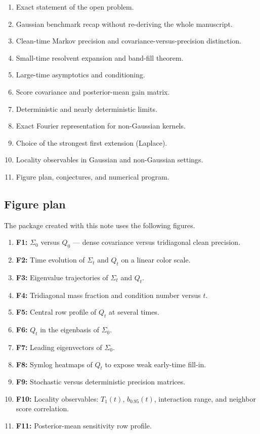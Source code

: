\documentclass[11pt]{article}
\begin{document}
\begin{enumerate}[label=\textbf{L\arabic*.},leftmargin=1.2cm]
\item Exact statement of the open problem.
\item Gaussian benchmark recap without re-deriving the whole manuscript.
\item Clean-time Markov precision and covariance-versus-precision distinction.
\item Small-time resolvent expansion and band-fill theorem.
\item Large-time asymptotics and conditioning.
\item Score covariance and posterior-mean gain matrix.
\item Deterministic and nearly deterministic limits.
\item Exact Fourier representation for non-Gaussian kernels.
\item Choice of the strongest first extension (Laplace).
\item Locality observables in Gaussian and non-Gaussian settings.
\item Figure plan, conjectures, and numerical program.
\end{enumerate}

\subsection{Figure plan}

The package created with this note uses the following figures.

\begin{enumerate}[label=\textbf{F\arabic*.},leftmargin=1.2cm]
\item \textbf{F1:} $\Sigma_0$ versus $Q_0$ --- dense covariance versus tridiagonal clean precision.
\item \textbf{F2:} Time evolution of $\Sigma_t$ and $Q_t$ on a linear color scale.
\item \textbf{F3:} Eigenvalue trajectories of $\Sigma_t$ and $Q_t$.
\item \textbf{F4:} Tridiagonal mass fraction and condition number versus $t$.
\item \textbf{F5:} Central row profile of $Q_t$ at several times.
\item \textbf{F6:} $Q_t$ in the eigenbasis of $\Sigma_0$.
\item \textbf{F7:} Leading eigenvectors of $\Sigma_0$.
\item \textbf{F8:} Symlog heatmaps of $Q_t$ to expose weak early-time fill-in.
\item \textbf{F9:} Stochastic versus deterministic precision matrices.
\item \textbf{F10:} Locality observables: $T_1(t)$, $b_{0.95}(t)$, interaction range, and neighbor score correlation.
\item \textbf{F11:} Posterior-mean sensitivity row profile.
\end{enumerate}
\end{document}
